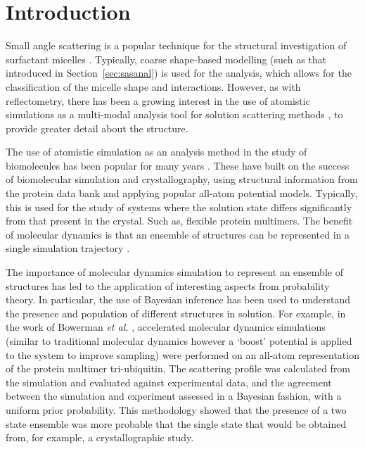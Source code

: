 \section{Introduction}

Small angle scattering is a popular technique for the structural investigation of surfactant micelles \cite{sanchez-fernandez_micellization_2016}.
Typically, coarse shape-based modelling (such as that introduced in Section~\ref{sec:sasanal}) is used for the analysis, which allows for the classification of the micelle shape and interactions.
However, as with reflectometry, there has been a growing interest in the use of atomistic simulations as a multi-modal analysis tool for solution scattering methods \cite{ivanovic_temperature-dependent_2018}, to provide greater detail about the structure.

The use of atomistic simulation as an analysis method in the study of biomolecules has been popular for many years \cite{perkins_solution_1991,mayans_demonstration_1995,hub_interpreting_2018}.
These have built on the success of biomolecular simulation and crystallography, using structural information from the protein data bank \cite{noauthor_rcsb_nodate} and applying popular all-atom potential models.
Typically, this is used for the study of systems where the solution state differs significantly from that present in the crystal.
Such as, flexible protein multimers.
The benefit of molecular dynamics is that an ensemble of structures can be represented in a single simulation trajectory \cite{chen_validating_2014,bowerman_determining_2017}.

The importance of molecular dynamics simulation to represent an ensemble of structures has led to the application of interesting aspects from probability theory.
In particular, the use of Bayesian inference has been used to understand the presence and population of different structures in solution.
For example, in the work of Bowerman \emph{et al.} \cite{bowerman_determining_2017}, accelerated molecular dynamics simulations (similar to traditional molecular dynamics however a `boost' potential is applied to the system to improve sampling) were performed on an all-atom representation of the protein multimer tri-ubiquitin.
The scattering profile was calculated from the simulation and evaluated against experimental data, and the agreement between the simulation and experiment assessed in a Bayesian fashion, with a uniform prior probability.
This methodology showed that the presence of a two state ensemble was more probable that the single state that would be obtained from, for example, a crystallographic study.

